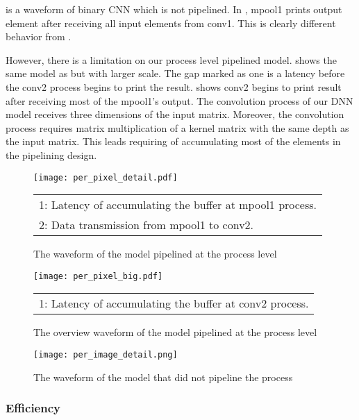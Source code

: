  is a waveform of binary CNN which is not pipelined. In , mpool1 prints output element after receiving all input elements from conv1. This is clearly different behavior from .

However, there is a limitation on our process level pipelined model.  shows the same model as  but with larger scale. The gap marked as one is a latency before the conv2 process begins to print the result.  shows conv2 begins to print result after receiving most of the mpool1's output. The convolution process of our DNN model receives three dimensions of the input matrix. Moreover, the convolution process requires matrix multiplication of a kernel matrix with the same depth as the input matrix. This leads requiring of accumulating most of the elements in the pipelining design.


\begin{figure}[tbp]
  \centering
  \texttt{[image: per\_pixel\_detail.pdf]}
    \begin{tabular}{l}
      1: Latency of accumulating the buffer at mpool1 process. \\
      2: Data transmission from mpool1 to conv2.
    \end{tabular}
  \caption{The waveform of the model pipelined at the process level}
  \label{fig:waveform_pipeline}
\end{figure}

\begin{figure}[tbp]
  \centering
  \texttt{[image: per\_pixel\_big.pdf]}
    \begin{tabular}{l}
      1: Latency of accumulating the buffer at conv2 process. \\
    \end{tabular}
  \caption{The overview waveform of the model pipelined at the process level}
  \label{fig:waveform_pipeline_overview}
\end{figure}

\begin{figure}[tbp]
  \centering
  \texttt{[image: per\_image\_detail.png]}
  \caption{The waveform of the model that did not pipeline the process}
  \label{fig:waveform_n_pipeline}
\end{figure}

\subsubsection{Efficiency}

